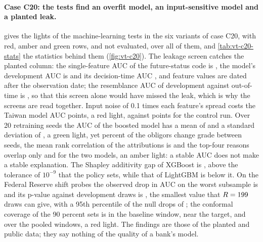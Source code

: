 \paragraph{Case C20: the tests find an overfit model, an input-sensitive model and a planted leak.}  gives the lights of the machine-learning tests in the six variants of case C20, with \vtCtwentyRed{} red, \vtCtwentyAmber{} amber and \vtCtwentyGreen{} green rows, and \vtCtwentyNotEval{} not evaluated, over all of them, and \cref{tab:vt-c20-stats} the statistics behind them (\cref{fig:vt-c20}). The leakage screen catches the planted column: the single-feature AUC of the future-status code is
\vtCTwoZeroLeakAuc{}, the model's development AUC is \vtCTwoZeroDevAuc{} and its decision-time AUC \vtCTwoZeroDecAuc{}, and \vtCTwoZeroLeakViol{} feature values are dated after the observation date; the resemblance AUC of development against out-of-time is \vtCTwoZeroResAuc{}, so that this screen alone would have missed the leak, which is why the screens are read together. Input noise of 0.1 times each feature's spread costs the Taiwan
model \vtCTwoZeroRobLoss{} AUC points, a red light, against \vtCTwoZeroRobCtl{} points for the control run. Over 20 retraining seeds the AUC of the boosted model has a mean of \vtCTwoZeroSeedMean{} and a standard deviation of \vtCTwoZeroSeedSd{}, a green light, yet \vtCTwoZeroSeedFlip{} percent of the obligors change grade between seeds, the mean rank correlation of the attributions is \vtCTwoZeroSeedTau{} and the top-four reasons overlap only \vtCTwoZeroReasonLgbm{} and \vtCTwoZeroReasonXgb{} for the two models, an amber light:
a stable AUC does not make a stable explanation. The Shapley additivity gap of XGBoost is \vtCTwoZeroAddXgb{}, above the tolerance of $10^{-9}$ that the policy sets, while that of LightGBM is below it. On the Federal Reserve shift probes the observed drop in AUC on the worst subsample is \vtCTwoZeroSrDrop{} and its p-value against \vtCTwoZeroSrPerm{} development draws is \vtCTwoZeroSrP{}, the smallest value that $R=199{}$ draws can give, with a 95th percentile of the null drops of \vtCTwoZeroSrNullPNineFive{}; the conformal coverage of the 90 percent sets is \vtCTwoZeroCovBase{} in the baseline window, near the target, and \vtCTwoZeroCovPooled{} over the pooled windows, a red light. The findings are those of the planted
and public data; they say nothing of the quality of a bank's model.




